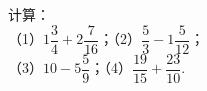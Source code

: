 计算：\\
（1）$1\dfrac {3}{4}+2\dfrac {7}{16}$；\hspace{5cm}（2）$\dfrac {5}{3}-1\dfrac {5}{12}$；\\[20pt]
（3）$10-5\dfrac {5}{9}$；\hspace{5.2cm}（4）$\dfrac {19}{15}+\dfrac {23}{10}$.